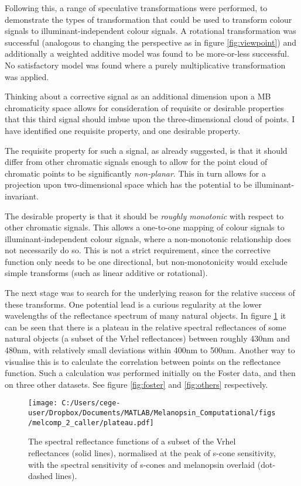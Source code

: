 Following this, a range of speculative transformations were performed, to demonstrate the types of transformation that could be used to transform colour signals to illuminant-independent colour signals. A rotational transformation was successful (analogous to changing the perspective as in figure \ref{fig:viewpoint}) and additionally a weighted additive model was found to be more-or-less successful. No satisfactory model was found where a purely multiplicative transformation was applied.

Thinking about a corrective signal as an additional dimension upon a \ac{MB} chromaticity space allows for consideration of requisite or desirable properties that this third signal should imbue upon the three-dimensional cloud of points. I have identified one requisite property, and one desirable property. 

The requisite property for such a signal, as already suggested, is that it should differ from other chromatic signals enough to allow for the point cloud of chromatic points to be significantly \emph{non-planar}. This in turn allows for a projection upon two-dimensional space which has the potential to be illuminant-invariant.

The desirable property is that it should be \emph{roughly monotonic} with respect to other chromatic signals. This allows a one-to-one mapping of colour signals to illuminant-independent colour signals, where a non-monotonic relationship does not necessarily do so. This is not a strict requirement, since the corrective function only needs to be one directional, but non-monotonicity would exclude simple transforms (such as linear additive or rotational).

The next stage was to search for the underlying reason for the relative success of these transforms. One potential lead is a curious regularity at the lower wavelengths of the reflectance spectrum of many natural objects. In figure \ref{fig:plateau} it can be seen that there is a plateau in the relative spectral reflectances of some natural objects (a subset of the Vrhel reflectances) between roughly 430nm and 480nm, with relatively small deviations within 400nm to 500nm. Another way to visualise this is to calculate the correlation between points on the reflectance function. Such a calculation was performed initially on the Foster data, and then on three other datasets. See figure \ref{fig:foster} and \ref{fig:others} respectively.

\begin{figure}[h]
    \centering
    \texttt{[image: C:/Users/cege-user/Dropbox/Documents/MATLAB/Melanopsin\_Computational/figs/melcomp\_2\_caller/plateau.pdf]}
    \caption{The spectral reflectance functions of a subset of the Vrhel reflectances (solid lines), normalised at the peak of s-cone sensitivity, with the spectral sensitivity of s-cones and melanopsin overlaid (dot-dashed lines).}
    \label{fig:plateau}
\end{figure} 

